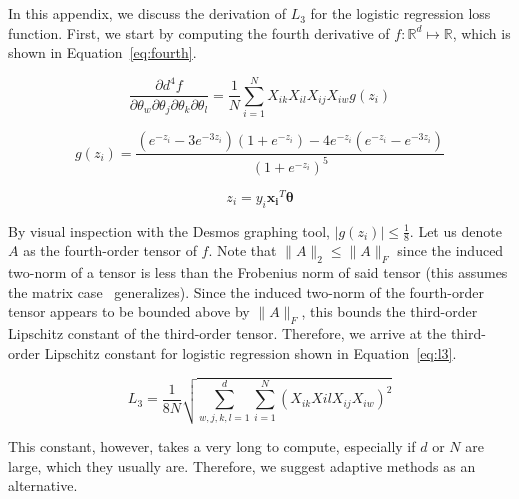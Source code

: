 \documentclass[journal]{IEEEtran}
\begin{document}



\appendices

\section{}\label{sec:test}

In this appendix, we discuss the derivation of $L_3$ for the logistic regression loss function. First, we start by computing the fourth derivative of $f: \mathbb{R}^d \mapsto \mathbb{R}$, which is shown in Equation~\ref{eq:fourth}.

\begin{equation}
    \frac{\partial d^4 f}{\partial \theta_w \partial \theta_j \partial \theta_k \partial \theta_l} = \frac{1}{N} \sum_{i=1}^N X_{ik} X_{il} X_{ij} X_{iw} g(z_i)
    \label{eq:fourth}
\end{equation}

\begin{equation}
    g(z_i) = \frac{(e^{-z_i} - 3e^{-3 z_i})(1 + e^{-z_i}) - 4e^{-z_i} (e^{-z_i} - e^{-3z_i})}{(1+e^{-z_i})^5}
\end{equation}

\begin{equation}
    z_i = y_i \mathbf{x_i}^T \mathbf{\theta}
\end{equation}

By visual inspection with the Desmos graphing tool, $|g(z_i)| \le \frac{1}{8}$. Let us denote $A$ as the fourth-order tensor of $f$. Note that $\|A\|_2 \le \|A\|_F$ since the induced two-norm of a tensor is less than the Frobenius norm of said tensor (this assumes the matrix case~\cite{frobenius} generalizes). Since the induced two-norm of the fourth-order tensor appears to be bounded above by $\|A\|_F$, this bounds the third-order Lipschitz constant of the third-order tensor. Therefore, we arrive at the third-order Lipschitz constant for logistic regression shown in Equation~\ref{eq:l3}.

\begin{equation}
    L_3 = \frac{1}{8N} \sqrt{\sum_{w, j, k, l = 1}^d \sum_{i=1}^N \left(X_{ik} X{il} X_{ij} X_{iw} \right)^2}
    \label{eq:l3}
\end{equation}

This constant, however, takes a very long to compute, especially if $d$ or $N$ are large, which they usually are. Therefore, we suggest adaptive methods as an alternative.
\end{document}
